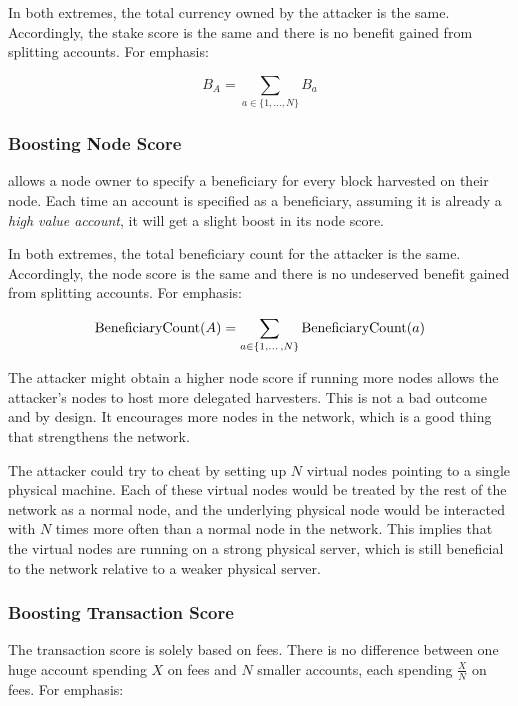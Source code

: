 In both extremes, the total currency owned by the attacker is the same.
Accordingly, the stake score is the same and there is no benefit gained from splitting accounts.
For emphasis:

\begin{equation}
B_A = \sum\limits_{a \in \{1, \dotso, N\}} B_a
\end{equation}

\subsubsection*{Boosting Node Score}

\codenamespace allows a node owner to specify a beneficiary for every block harvested on their node.
Each time an account is specified as a beneficiary, assuming it is already a \emph{high value account}, it will get a slight boost in its node score.

In both extremes, the total beneficiary count for the attacker is the same.
Accordingly, the node score is the same and there is no undeserved benefit gained from splitting accounts.
For emphasis:

\begin{equation}
\operatorname{BeneficiaryCount}(A) = \sum\limits_{a \in \{1, \dotso, N\}} \operatorname{BeneficiaryCount}(a)
\end{equation}

The attacker might obtain a higher node score if running more nodes allows the attacker's nodes to host more delegated harvesters.
This is not a bad outcome and by design.
It encourages more nodes in the network, which is a good thing that strengthens the network.

The attacker could try to cheat by setting up $N$ virtual nodes pointing to a single physical machine.
Each of these virtual nodes would be treated by the rest of the network as a normal node, and the underlying physical node would be interacted with $N$ times more often than a normal node in the network.
This implies that the virtual nodes are running on a strong physical server, which is still beneficial to the network relative to a weaker physical server.

\subsubsection*{Boosting Transaction Score}

The transaction score is solely based on fees.
There is no difference between one huge account spending $X$ on fees and $N$ smaller accounts, each spending $\frac{X}{N}$ on fees.
For emphasis:

